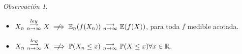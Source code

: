 \documentclass[letterpaper,11pt]{article} %
\theoremstyle{defbreak}
\theoremstyle{propbreak}
\theoremstyle{remark}
\newtheorem{remark}{Observación}[subsection]
\theoremstyle{break}
\def\conv{\mbox{ }\substack{\longrightarrow \\ n\to\infty}\mbox{ }}
\def\beforeitemize{\leavevmode \vspace{-0.5\baselineskip}}
\begin{document}
\begin{remark}
\beforeitemize
\begin{itemize}
    \item $X_n\mbox{ }\overset{ley}{\substack{\longrightarrow \\n \to \infty}}\mbox{ }X \centernot\implies \mathbb{E}_n(f(X_n)) \mbox{ }\substack{\longrightarrow \\ n\to\infty}\mbox{ } \mathbb{E}(f(X))$, para toda $f$ medible acotada.
    \item $X_n\mbox{ }\overset{ley}{\substack{\longrightarrow \\n \to \infty}}\mbox{ }X \centernot\implies \mathbb{P}(X_n\leq x) \conv \mathbb{P}(X\leq x) \forall x \in \mathbb{R}$.
\end{itemize}

\end{remark}
\end{document}
